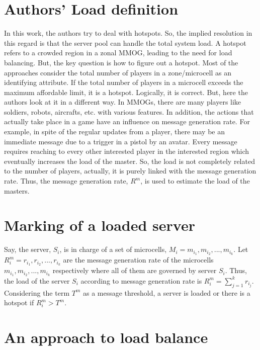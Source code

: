 \section{Authors' Load definition}

In this work, the authors try to deal with hotspots. So, the implied resolution in this regard is that the server pool can handle the total system load. A hotspot refers to a crowded region in a zonal MMOG, leading to the need for load balancing. But, the key question is how to figure out a hotspot. Most of the approaches consider the total number of players in a zone/microcell as an identifying attribute. If the total number of players in a microcell exceeds the maximum affordable limit, it is a hotspot. Logically, it is correct. But, here the authors look at it in a different way. In MMOGs, there are many players like soldiers, robots, aircrafts, etc. with various features. In addition, the actions that actually take place in a game have an influence on message generation rate. For example, in spite of the regular updates from a player, there may be an immediate message due to a trigger in a pistol by an avatar. Every message requires reaching to every other interested player in the interested region which eventually increases the load of the master. So, the load is not completely related to the number of players, actually, it is purely linked with the message generation rate. Thus, the message generation rate, $R^m$, is used to estimate the load of the masters.



\section{Marking of a loaded server}

Say, the server, $S_i$, is in charge of a set of microcells, $M_i = {m_{i_1} ,m_{i_2} , ..., m_{i_k}}$. Let $R^m_i = {r_{i_1} , r_{i_2} , ..., r_{i_k}}$ are the message generation rate of the microcells ${m_{i_1}, m_{i_2} , ..., m_{i_k}}$ respectively where all of them are governed by server $S_i$. Thus, the load of the server $S_i$ according to message generation rate is $R^m_i = \sum_{j=1}^k r_{i_j}$. Considering the term $T^m$ as a message threshold, a server is loaded or there is a hotspot if $R^m_i > T^m$.



\section{An approach to load balance}

